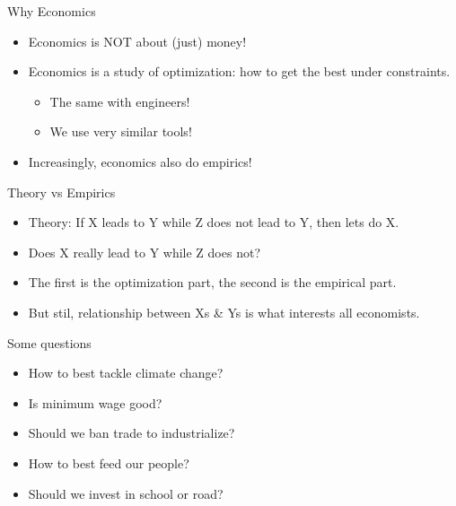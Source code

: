 \documentclass[
  ignorenonframetext,
]{beamer}
\begin{document}
\begin{frame}{Why Economics}
\protect\hypertarget{why-economics}{}
\begin{itemize}
\item
  Economics is NOT about (just) money!
\item
  Economics is a study of optimization: how to get the best under
  constraints.

  \begin{itemize}
  \item
    The same with engineers!
  \item
    We use very similar tools!
  \end{itemize}
\item
  Increasingly, economics also do empirics!
\end{itemize}
\end{frame}

\begin{frame}{Theory vs Empirics}
\protect\hypertarget{theory-vs-empirics}{}
\begin{itemize}
\item
  Theory: If X leads to Y while Z does not lead to Y, then lets do X.
\item
  Does X really lead to Y while Z does not?
\item
  The first is the optimization part, the second is the empirical part.
\item
  But stil, relationship between Xs \& Ys is what interests all
  economists.
\end{itemize}
\end{frame}

\begin{frame}{Some questions}
\protect\hypertarget{some-questions}{}
\begin{itemize}
\item
  How to best tackle climate change?
\item
  Is minimum wage good?
\item
  Should we ban trade to industrialize?
\item
  How to best feed our people?
\item
  Should we invest in school or road?
\end{itemize}
\end{frame}
\end{document}
